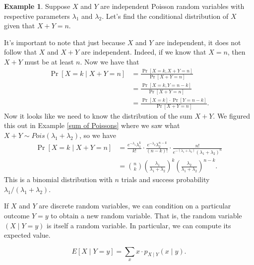 \documentclass[12pt]{article}
\theoremstyle{plain}
\theoremstyle{definition}
\newtheorem{example}[theorem]{Example}
\theoremstyle{remark}
\begin{document}
\begin{example}
    Suppose $X$ and $Y$ are independent Poisson random variables with respective parameters $\lambda_1$ and $\lambda_2$.
    Let's find the conditional distribution of $X$ given that $X+Y = n$.

    It's important to note that just because $X$ and $Y$ are independent, it does not follow that $X$ and $X+Y$ are independent.
    Indeed, if we know that $X = n$, then $X+Y$ must be at least $n$.
    Now we have that
    \begin{align*}
        \Pr[X = k\mid X+Y = n] &= \frac{\Pr[X=k, X+Y = n]}{\Pr[X+Y = n]}\\
        &= \frac{\Pr[X=k, Y = n-k]}{\Pr[X+Y=n]}\\
        &= \frac{\Pr[X=k]\cdot \Pr[Y = n-k]}{\Pr[X+Y=n]}.
    \end{align*}
    Now it looks like we need to know the distribution of the sum $X+Y$.
    We figured this out in Example \ref{sum of Poissons} where we saw what $X+Y\sim Pois(\lambda_1+\lambda_2)$, so we have
    \begin{align*}
        \Pr[X=k\mid X+Y = n] &= \frac{e^{-\lambda_1}\lambda_1^k}{k!}\cdot \frac{e^{-\lambda_2}\lambda_2^{n-k}}{(n-k)!} \cdot \frac{n!}{e^{-(\lambda_1+\lambda_2)}(\lambda_1+\lambda_2)^n}\\
        &= \binom{n}{k}\left(\frac{\lambda_1}{\lambda_1+\lambda_2}\right)^k\left(\frac{\lambda_2}{\lambda_1+\lambda_2}\right)^{n-k}.
    \end{align*}
    This is a binomial distribution with $n$ trials and success probability $\lambda_1/(\lambda_1+\lambda_2)$.
\end{example}

If $X$ and $Y$ are discrete random variables, we can condition on a particular outcome $Y = y$ to obtain a new random variable.
That is, the random variable $(X\mid Y = y)$ is itself a random variable.
In particular, we can compute its expected value.

\[
    E[X\mid Y=y] = \sum_x x\cdot p_{X\mid Y}(x\mid y).
\]

\end{document}
